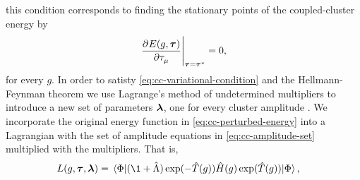             this condition corresponds to finding the stationary points of the
            coupled-cluster energy by
            \begin{align}
                \left.
                \dpd[]{E(g, \vfg{\clustamp})}{\clustamp_{\mu}}
                \right\rvert_{\vfg{\clustamp} = \vfg{\clustamp}^{*}}
                = 0,
                \label{eq:cc-variational-condition}
            \end{align}
            for every $g$.
            In order to satisty \autoref{eq:cc-variational-condition} and the
            Hellmann-Feynman theorem we use Lagrange's method of undetermined
            multipliers to introduce a new set of parameters $\boldsymbol{\lambda}$,
            one for every cluster amplitude \cite{helgaker-molecular}.
            We incorporate the original energy function in
            \autoref{eq:cc-perturbed-energy} into a Lagrangian with the set of
            amplitude equations in \autoref{eq:cc-amplitude-set} multiplied with
            the multipliers.
            That is,
            \begin{align}
                L(g, \vfg{\clustamp}, \vfg{\clustlamp})
                &=
                \mel*{\slat}{
                    (\1 + \clustl)
                    \exponential(-\clust(g))
                    \hamil(g)
                    \exponential(\clust(g))
                }{\slat},
                \label{eq:cc-perturbed-lagrangian}
            \end{align}
